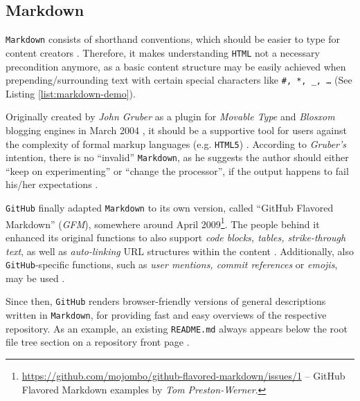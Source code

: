 \subsection{Markdown}
\label{sec:buildpipelines-markdown}



\texttt{Markdown} consists of shorthand conventions, which should be easier to type for content creators  \cite[38]{dhillon2016}.
Therefore, it makes understanding \texttt{HTML} not a necessary precondition anymore, as a basic content structure may be easily achieved when prepending/surrounding text with certain special characters like \texttt{\#, *, \_, \ldots} (See Listing \ref{list:markdown-demo}).

Originally created by \emph{John Gruber} as a plugin for \emph{Movable Type} and \emph{Blosxom} blogging engines in March 2004 \cite{Markdown2004introduction}\cite{Markdown2004main}, it should be a supportive tool for users against the complexity of formal markup languages (e.g. \texttt{HTML5}) \cite[4]{RFC7764}. According to \emph{Gruber's} intention, there is no ``invalid'' \texttt{Markdown}, as he suggests the author should either ``keep on experimenting'' or ``change the processor'', if the output happens to fail his/her expectations \cite[5]{RFC7764}.

\texttt{GitHub} finally adapted \texttt{Markdown} to its own version, called ``GitHub Flavored Markdown'' (\emph{GFM}), somewhere around April 2009\footnote{\url{https://github.com/mojombo/github-flavored-markdown/issues/1} -- GitHub Flavored Markdown examples by \emph{Tom Preston-Werner}.}. The people behind it enhanced its original functions to also support \emph{code blocks, tables, strike-through text}, as well as \emph{auto-linking} URL structures within the content \cite[18]{RFC7764}. Additionally, also \texttt{GitHub}-specific functions, such as \emph{user mentions, commit references} or \emph{emojis}, may be used \cite{GithubFlavoredMarkdown}.

Since then, \texttt{GitHub} renders browser-friendly versions of general descriptions written in \texttt{Markdown}, for providing fast and easy overviews of the respective repository. As an example, an existing \texttt{README.md} always appears below the root file tree section on a repository front page \cite[5]{gandrud2013github}.
